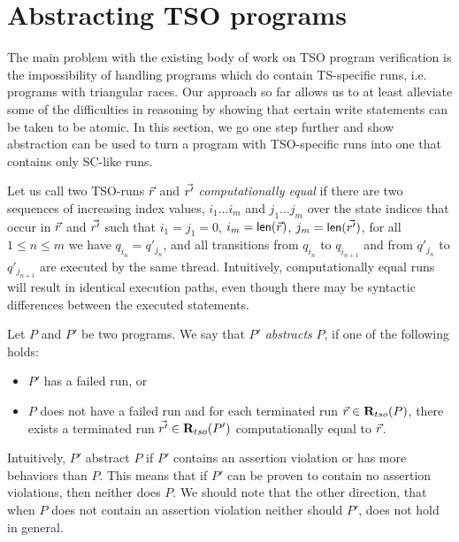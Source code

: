 \section{Abstracting TSO programs}
\label{sec:abstracting-tso-programs}
The main problem with the existing body of work on TSO program verification is the impossibility of handling programs which do contain TS-specific runs, i.e. programs with triangular races.
Our approach so far allows us to at least alleviate some of the difficulties in reasoning by showing that certain write statements can be taken to be atomic.
In this section, we go one step further and show abstraction can be used to turn a program with TSO-specific runs into one that contains only SC-like runs.

Let us call two TSO-runs $\vec{r}$ and $\vec{r'}$ {\em computationally equal} if there are two sequences of increasing index values, $i_1\ldots i_m$ and $j_1\ldots j_m$ over the state indices that occur in $\vec{r}$ and $\vec{r'}$ such that $i_1=j_1=0$, $i_m=\mathsf{len}(\vec{r})$, $j_m=\mathsf{len}(\vec{r'})$, for all $1\leq n\leq m$ we have $q_{i_n}=q'_{j_n}$, and all transitions from $q_{i_n}$ to $q_{i_{n+1}}$ and from $q'_{j_n}$ to $q'_{j_{n+1}}$ are executed by the same thread.
Intuitively, computationally equal runs will result in identical execution paths, even though there may be syntactic differences between the executed statements.

\begin{definition}
Let $P$ and $P'$ be two programs.
We say that $P'$ {\em abstracts} $P$, if one of the following holds:
\begin{itemize}
\item $P'$ has a failed run, or
\item $P$ does not have a failed run and for each terminated run $\vec{r}\in\mathbf{R}_{tso}(P)$, there exists a terminated run $\vec{r'}\in\mathbf{R}_{tso}(P')$ computationally equal to $\vec{r}$.
\end{itemize}
\end{definition}
Intuitively, $P'$ abstract $P$ if $P'$ contains an assertion violation or has more behaviors than $P$.
This means that if $P'$ can be proven to contain no assertion violations, then neither does $P$.
We should note that the other direction, that when $P$ does not contain an assertion violation neither should $P'$, does not hold in general.

